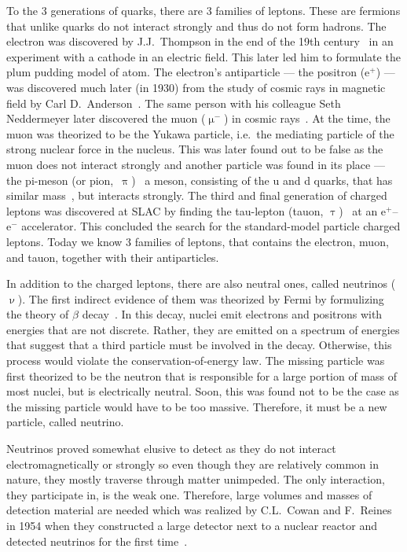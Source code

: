To the 3 generations of quarks, there are 3 families of leptons. These are fermions that unlike quarks do not interact strongly and thus do not form hadrons. The electron was discovered by J.J.\ Thompson in the end of the 19th century~\cite{thomson1897cathode} in an experiment with a cathode in an electric field\@. This later led him to formulate the plum pudding model of atom. The electron's antiparticle --- the positron (e$^+$) --- was discovered much later (in 1930) from the study of cosmic rays in magnetic field by Carl D.\ Anderson~\cite{positron}\@. The same person with his colleague Seth Neddermeyer later discovered the muon ($\upmu^-$) in cosmic rays~\cite{muon}\@. At the time, the muon was theorized to be the Yukawa particle, i.e.\ the mediating particle of the strong nuclear force in the nucleus. This was later found out to be false as the muon does not interact strongly and another particle was found in its place --- the pi-meson (or pion,~$\uppi$)~\cite{pion} a meson, consisting of the u and d quarks, that has similar mass~\cite{PDG}, but interacts strongly. The third and final generation of charged leptons was discovered at SLAC by finding the tau-lepton (tauon, $\uptau$)~\cite{tau} at an e$^+$--e$^-$ accelerator\@. This concluded the search for the standard-model particle charged leptons. Today we know 3 families of leptons, that contains the electron, muon, and tauon, together with their antiparticles.

In addition to the charged leptons, there are also neutral ones, called neutrinos ($\upnu$)\@. The first indirect evidence of them was theorized by Fermi by formulizing the theory of $\beta$ decay~\cite{Fermi}\@. In this decay, nuclei emit electrons and positrons with energies that are not discrete. Rather, they are emitted on a spectrum of energies that suggest that a third particle must be involved in the decay. Otherwise, this process would violate the conservation-of-energy law. The missing particle was first theorized to be the neutron that is responsible for a large portion of mass of most nuclei, but is electrically neutral. Soon, this was found not to be the case as the missing particle would have to be too massive. Therefore, it must be a new particle, called neutrino.

Neutrinos proved somewhat elusive to detect as they do not interact electromagnetically or strongly so even though they are relatively common in nature, they mostly traverse through matter unimpeded. The only interaction, they participate in, is the weak one. Therefore, large volumes and masses of detection material are needed which was realized by C.L.\ Cowan and F.\ Reines in 1954 when they constructed a large detector next to a nuclear reactor and detected neutrinos for the first time~\cite{CowanNeutrinos}\@.

